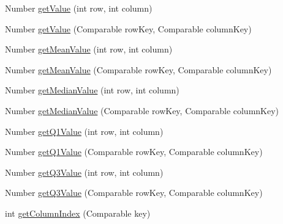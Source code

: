 \begin{DoxyCompactItemize}
\item 
Number \mbox{\hyperlink{classorg_1_1jfree_1_1data_1_1statistics_1_1_default_box_and_whisker_category_dataset_ad81af186cdf52a94633a5a1a3d3200ba}{get\+Value}} (int row, int column)
\item 
Number \mbox{\hyperlink{classorg_1_1jfree_1_1data_1_1statistics_1_1_default_box_and_whisker_category_dataset_a1cc42e6e9cebb07fc3ad2bab59733088}{get\+Value}} (Comparable row\+Key, Comparable column\+Key)
\item 
Number \mbox{\hyperlink{classorg_1_1jfree_1_1data_1_1statistics_1_1_default_box_and_whisker_category_dataset_a700a1e0b318bce923ba3db9a69be337c}{get\+Mean\+Value}} (int row, int column)
\item 
Number \mbox{\hyperlink{classorg_1_1jfree_1_1data_1_1statistics_1_1_default_box_and_whisker_category_dataset_ae7121e3be6e26ded88ea1fdf5e4a55d0}{get\+Mean\+Value}} (Comparable row\+Key, Comparable column\+Key)
\item 
Number \mbox{\hyperlink{classorg_1_1jfree_1_1data_1_1statistics_1_1_default_box_and_whisker_category_dataset_a71fe367beb1408e129204aa19fa5502b}{get\+Median\+Value}} (int row, int column)
\item 
Number \mbox{\hyperlink{classorg_1_1jfree_1_1data_1_1statistics_1_1_default_box_and_whisker_category_dataset_a2db62c7c2bbb443cb7f03058c64c2a76}{get\+Median\+Value}} (Comparable row\+Key, Comparable column\+Key)
\item 
Number \mbox{\hyperlink{classorg_1_1jfree_1_1data_1_1statistics_1_1_default_box_and_whisker_category_dataset_a4b862aaed6798d006e261389b4a2c63b}{get\+Q1\+Value}} (int row, int column)
\item 
Number \mbox{\hyperlink{classorg_1_1jfree_1_1data_1_1statistics_1_1_default_box_and_whisker_category_dataset_a7eccedd56414d1898ad1f2844ba2ac1f}{get\+Q1\+Value}} (Comparable row\+Key, Comparable column\+Key)
\item 
Number \mbox{\hyperlink{classorg_1_1jfree_1_1data_1_1statistics_1_1_default_box_and_whisker_category_dataset_ac0f6a03c68dbec0f36b4c0e3e6005ba4}{get\+Q3\+Value}} (int row, int column)
\item 
Number \mbox{\hyperlink{classorg_1_1jfree_1_1data_1_1statistics_1_1_default_box_and_whisker_category_dataset_acb0aafdae7cb218b7164669d19f81b96}{get\+Q3\+Value}} (Comparable row\+Key, Comparable column\+Key)
\item 
int \mbox{\hyperlink{classorg_1_1jfree_1_1data_1_1statistics_1_1_default_box_and_whisker_category_dataset_a2c2546143d897b391809f172566a1e00}{get\+Column\+Index}} (Comparable key)

\end{DoxyCompactItemize}
